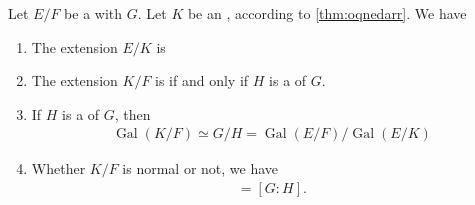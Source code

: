 \documentclass{article}
\begin{document}
\begin{thma}
Let $E / F$ be a  with  $G$. Let $K$ be an ,  according to \cref{thm:oqnedarr}. We have
\begin{enumerate}
    \item The extension $E / K$ is 
    \item The extension $K / F$ is  if and only if $H$ is a  of $G$.
    \item If $H$ is a  of $G$, then
    \begin{align*}
\operatorname{Gal}(K / F) \simeq G / H=\operatorname{Gal}(E / F) / \operatorname{Gal}(E / K)
\end{align*}
\item Whether $K / F$ is normal or not, we have
\begin{align*}
[K: F]=[G: H] .
\end{align*}
\end{enumerate}
\end{thma} 
\end{document}
